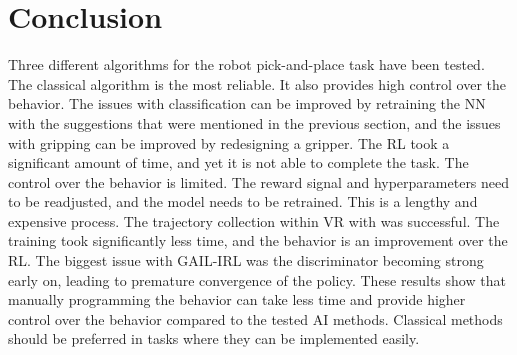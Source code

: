 \section{Conclusion}
Three different algorithms for the robot pick-and-place task have been tested. The classical algorithm is the most reliable. It also provides high control over the behavior. The issues with classification can be improved by retraining the NN with the suggestions that were mentioned in the previous section, and the issues with gripping can be improved by redesigning a gripper. The RL took a significant amount of time, and yet it is not able to complete the task. The control over the behavior is limited. The reward signal and hyperparameters need to be readjusted, and the model needs to be retrained. This is a lengthy and expensive process. The trajectory collection within VR with \nametwo was successful. The training took significantly less time, and the behavior is an improvement over the RL. The biggest issue with GAIL-IRL was the discriminator becoming strong early on, leading to premature convergence of the policy. These results show that manually programming the behavior can take less time and provide higher control over the behavior compared to the tested AI methods. Classical methods should be preferred in tasks where they can be implemented easily. 